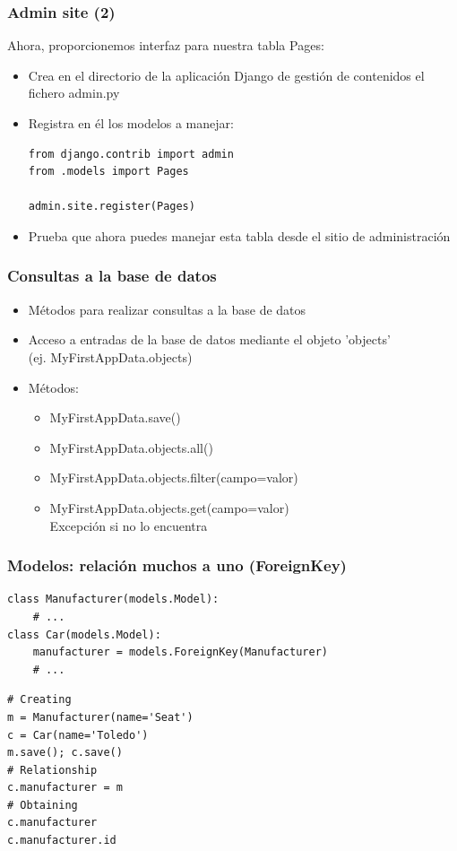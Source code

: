 \begin{frame}[fragile]
\frametitle{Admin site (2)}

Ahora, proporcionemos interfaz para nuestra tabla Pages:

\begin{itemize}
\item Crea en el directorio de la aplicación Django de gestión de contenidos el fichero admin.py
\item Registra en él los modelos a manejar:
\begin{verbatim}
from django.contrib import admin
from .models import Pages

admin.site.register(Pages)
\end{verbatim}
\item Prueba que ahora puedes manejar esta tabla desde el sitio de administración
\end{itemize}
\end{frame}



\begin{frame}
\frametitle{Consultas a la base de datos}

\begin{itemize}
\item Métodos para realizar consultas a la base de datos
\item Acceso a entradas de la base de datos mediante el objeto 'objects' \\
  (ej. MyFirstAppData.objects)
\item Métodos:
\begin{itemize}
\item MyFirstAppData.save()
\item MyFirstAppData.objects.all()
\item MyFirstAppData.objects.filter(campo=valor)
\item MyFirstAppData.objects.get(campo=valor) \\
  Excepción si no lo encuentra
\end{itemize}
\end{itemize}

\end{frame}



\begin{frame}[fragile]
\frametitle{Modelos: relación muchos a uno (ForeignKey)}

\begin{verbatim}
class Manufacturer(models.Model):
    # ...
class Car(models.Model):
    manufacturer = models.ForeignKey(Manufacturer)
    # ...
\end{verbatim}


\begin{verbatim}
# Creating
m = Manufacturer(name='Seat')
c = Car(name='Toledo')
m.save(); c.save()
# Relationship
c.manufacturer = m
# Obtaining
c.manufacturer
c.manufacturer.id
\end{verbatim}

\end{frame}


